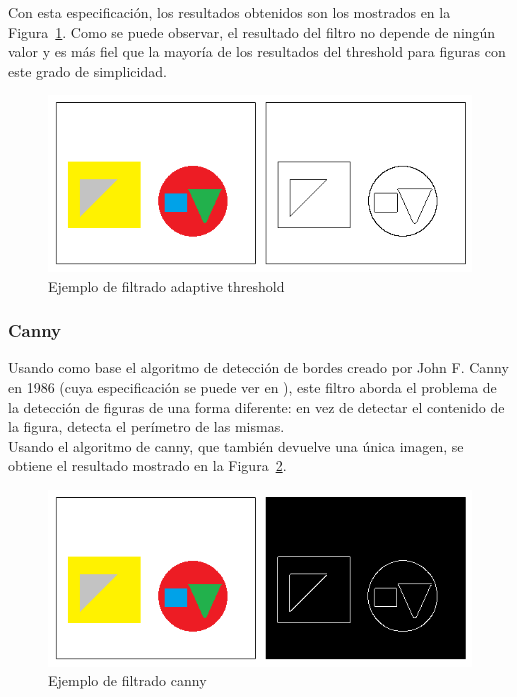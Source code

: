 {	Con esta especificación, los resultados obtenidos son los mostrados en la Figura~\ref{fig:adaptive}. Como se puede observar, el resultado del filtro no depende de ningún valor y es más fiel que la mayoría de los resultados del threshold para figuras con este grado de simplicidad.\\
	
		\begin{figure}[!htbp]
		\centering
		\includegraphics[scale=0.47]{graphics/adaptive.png}
		\caption{Ejemplo de filtrado adaptive threshold}
		\label{fig:adaptive}
		\end{figure}
	
	\subsubsection{Canny}
	
	Usando como base el algoritmo de detección de bordes creado por John F. Canny en 1986 (cuya especificación se puede ver en \cite{pajares}), este filtro aborda el problema de la detección de figuras de una forma diferente: en vez de detectar el contenido de la figura, detecta el perímetro de las mismas.\\
	
	Usando el algoritmo de canny, que también devuelve una única imagen, se obtiene el resultado mostrado en la Figura~\ref{fig:canny}.\\
	
		\begin{figure}[!htbp]
		\centering
		\includegraphics[scale=0.47]{graphics/canny.png}
		\caption{Ejemplo de filtrado canny}
		\label{fig:canny}
		\end{figure}
		
}
